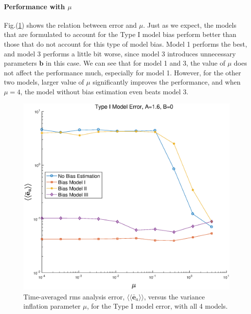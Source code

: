 \documentclass[twocolumn]{article}
\begin{document}
\paragraph{Performance with $\mu$}
Fig.(\ref{AErrVsMuM1.1}) shows the relation between error and $\mu$. Just as we expect, the models that are formulated to account for the Type I model bias perform better than those that do not account for this type of model bias. Model 1 performs the best, and model 3 performs a little bit worse, since model 3 introduces unnecessary parameters $\pmb{b}$ in this case. We can see that for model 1 and 3, the value of $\mu$ does not affect the performance much, especially for model 1. However, for the other two models, larger value of $\mu$ significantly improves the performance, and when $\mu=4$, the model without bias estimation even beats model 3.
\begin{figure} 
\centering
\includegraphics[scale=0.3]{Figures/AErrVsMuM1_1}
\caption{Time-averaged rms analysis error, $\langle\langle\bar{\pmb{e}}_a\rangle\rangle$, versus the variance inflation parameter $\mu$, for the Type I model error, with all 4 models.}
\label{AErrVsMuM1.1}
\end{figure}
\end{document}
